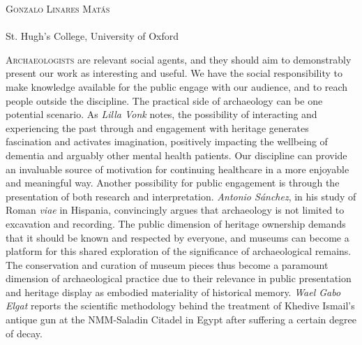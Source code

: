 \openingarticle
\def\ppages{\pagerange{presentation:firstpage}{presentation:lastpage}}
\def\shorttitle{IJSRA Issue Presentation}
\def\maintitle{Presentation of the first issue of the \emph{International Journal of Student Research in Archaeology}}
\def\shortauthor{Gonzalo Linares Matás}
\def\authormail{gonzalo.linaresmatas@st-hughs.ox.ac.uk}
\def\affiliation{St. Hugh's College, University of Oxford}
\def\thanknote{\footnote{\href{https://oxford.academia.edu/GonzaloLinaresMat\%C3\%A1s}{Gonzalo Linares Matás} is a second-year undergraduate studying the BA in Archaeology \& Anthropology at St. Hugh’s College, University of Oxford.}}
\begin{center}
	{\Large\scshape\shortauthor}\\[1em]
	\email \\
	\affiliation
\end{center}
\vspace{3em}
\midarticle
\label{presentation:firstpage}

\lettrine[slope=4pt,findent=-3pt,lines=3]{A}{rchaeologists} are relevant social agents, and they should aim to demonstrably pre\-sent our work as interesting and useful. 
We have the social responsibility to make knowledge available for the public engage with our audience, and to reach people outside the discipline. The practical side of archaeology can be one potential scenario. 
As \emph{Lilla Vonk} notes, the possibility of interacting and experiencing the past through and engagement with heritage generates fascination and activates imagination, positively impacting the wellbeing of dementia and arguably other mental health patients. 
Our discipline can provide an invaluable source of motivation for continuing healthcare in a more enjoyable and meaningful way. Another possibility for public engagement is through the presentation of both research and interpretation. 
\emph{Antonio Sánchez}, in his study of Roman \textit{viae} in Hispania, convincingly argues that archaeology is not limited to excavation and recording. 
The public dimension of heritage ownership demands that it should be known and respected by everyone, and museums can become a platform for this shared exploration of the significance of archaeological remains.
The conservation and curation of museum pieces thus become a paramount dimension of archaeological practice due to their relevance in public presentation and heritage display as embodied materiality of historical memory.
\emph{Wael Gabo Elgat} reports the scientific methodology behind the treatment of Khedive Ismail’s antique gun at the NMM-Saladin Citadel in Egypt after suffering a certain degree of decay.
		
